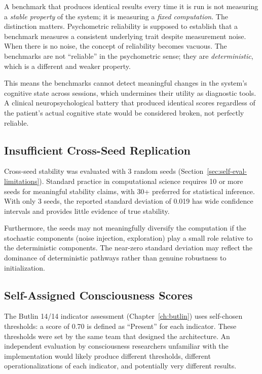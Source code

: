 \documentclass[12pt]{book}
\begin{document}
A benchmark that produces identical results every time it is run is not measuring a \textit{stable property} of the system; it is measuring a \textit{fixed computation}. The distinction matters. Psychometric reliability is supposed to establish that a benchmark measures a consistent underlying trait despite measurement noise. When there is no noise, the concept of reliability becomes vacuous. The benchmarks are not ``reliable'' in the psychometric sense; they are \textit{deterministic}, which is a different and weaker property.

This means the benchmarks cannot detect meaningful changes in the system's cognitive state across sessions, which undermines their utility as diagnostic tools. A clinical neuropsychological battery that produced identical scores regardless of the patient's actual cognitive state would be considered broken, not perfectly reliable.

\subsection{Insufficient Cross-Seed Replication}

Cross-seed stability was evaluated with 3 random seeds (Section~\ref{sec:self-eval-limitations}). Standard practice in computational science requires 10 or more seeds for meaningful stability claims, with 30+ preferred for statistical inference. With only 3 seeds, the reported standard deviation of 0.019 has wide confidence intervals and provides little evidence of true stability.

Furthermore, the seeds may not meaningfully diversify the computation if the stochastic components (noise injection, exploration) play a small role relative to the deterministic components. The near-zero standard deviation may reflect the dominance of deterministic pathways rather than genuine robustness to initialization.

\subsection{Self-Assigned Consciousness Scores}

The Butlin 14/14 indicator assessment (Chapter~\ref{ch:butlin}) uses self-chosen thresholds: a score of 0.70 is defined as ``Present'' for each indicator. These thresholds were set by the same team that designed the architecture. An independent evaluation by consciousness researchers unfamiliar with the implementation would likely produce different thresholds, different operationalizations of each indicator, and potentially very different results.
\end{document}
